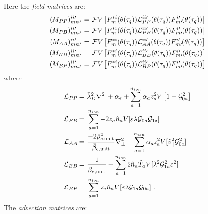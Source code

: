 %
Here the \textit{field matrices} are:
\begin{align}
(M_{PP})_{mm^\prime}^{ii\prime} = &~{\cal F}V\left[ F_{m}^{*i}(\theta(\tau_q))
{\cal L}_{PP}^{ii\prime}(\theta(\tau_q))F_{m\prime}^{i\prime}(\theta(\tau_q)) \right] \\
(M_{PB})_{mm^\prime}^{ii\prime} = &~{\cal F}V\left[ F_{m}^{*i}(\theta(\tau_q))
{\cal L}_{PB}^{ii\prime}(\theta(\tau_q)) F_{m\prime}^{i\prime}(\theta(\tau_q)) \right] \\
(M_{AA})_{mm^\prime}^{ii\prime} = &~{\cal F}V\left[ F_{m}^{*i}(\theta(\tau_q))
{\cal L}_{AA}^{ii\prime}(\theta(\tau_q)) F_{m\prime}^{i\prime}(\theta(\tau_q)) \right] \\
(M_{BB})_{mm^\prime}^{ii\prime} = &~{\cal F}V\left[ F_{m}^{*i}(\theta(\tau_q))
{\cal L}_{BB}^{ii\prime}(\theta(\tau_q)) F_{m\prime}^{i\prime}(\theta(\tau_q)) \right] \\
(M_{BP})_{mm^\prime}^{ii\prime} = &~{\cal F}V\left[ F_{m}^{*i}(\theta(\tau_q))
{\cal L}_{BP}^{ii\prime}(\theta(\tau_q)) F_{m\prime}^{i\prime}(\theta(\tau_q)) \right]
\end{align}
%
where
%
\begin{align}
{\cal L}_{PP} = &~\bar{\lambda}_{D}^2 \nabla_\perp^2 + \alpha_{e} + \sum_{a=1}^{n_{ion}} 
\alpha_{a} z_{a}^{2} V\left[ 1-{\cal G}_{0a}^{2} \right] \\
{\cal L}_{PB} = &~\sum_{a=1}^{n_{ion}} -2 z_{a} \hat{n}_{a}
V[\varepsilon \lambda {\cal G}_{0a} {\cal G}_{1a} ] \\
{\cal L}_{AA} = &~\frac{- 2 {\bar \rho}_{s,{\rm unit}}^{2}}{\bar{\beta}_{e,{\rm unit}}}
\nabla_{\perp}^{2} + \sum_{a=1}^{n_{ion}} \alpha_{a} z_{a}^{2}
V[\hat{v}_{\parallel}^{2}{\cal G}_{0a}^{2}] \\
{\cal L}_{BB} = &~\frac{1}{\bar{\beta}_{e,{\rm unit}}} +  
\sum_{a=1}^{n_{ion}} 2  \hat{n}_{a} \hat{T}_{a}
V[\lambda^{2} {\cal G}_{1a}^{2} \varepsilon^{2} ] \\
{\cal L}_{BP} = &~\sum_{a=1}^{n_{ion}} z_{a} \hat{n}_{a}
V[\varepsilon \lambda {\cal G}_{1a} {\cal G}_{0a} ] \; .
\end{align}
%
The \textit{advection matrices} are:
%
